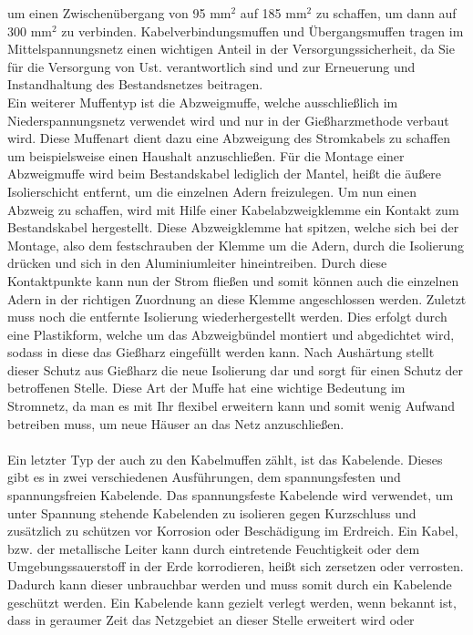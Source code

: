 um einen Zwischenübergang von 95 mm$^2$ auf 185 mm$^2$ zu schaffen, um dann auf 300 mm$^2$ zu verbinden. Kabelverbindungsmuffen und Übergangsmuffen tragen im 
Mittelspannungsnetz einen wichtigen Anteil in der Versorgungssicherheit, da Sie für die Versorgung von Ust. verantwortlich sind und zur Erneuerung und 
Instandhaltung des Bestandsnetzes beitragen. \autocite{Cellpack}
\\
Ein weiterer Muffentyp ist die Abzweigmuffe, welche ausschließlich im Niederspannungsnetz verwendet wird und nur in der Gießharzmethode verbaut wird. Diese 
Muffenart dient dazu eine Abzweigung des Stromkabels zu schaffen um beispielsweise einen Haushalt anzuschließen. Für die Montage einer Abzweigmuffe wird beim 
Bestandskabel lediglich der Mantel, heißt die äußere Isolierschicht entfernt, um die einzelnen Adern freizulegen. Um nun einen Abzweig zu schaffen, wird mit 
Hilfe einer Kabelabzweigklemme ein Kontakt zum Bestandskabel hergestellt. Diese Abzweigklemme hat spitzen, welche sich bei der Montage, also dem festschrauben 
der Klemme um die Adern, durch die Isolierung drücken und sich in den Aluminiumleiter hineintreiben. Durch diese Kontaktpunkte kann nun der Strom fließen und 
somit können auch die einzelnen Adern in der richtigen Zuordnung an diese Klemme angeschlossen werden. Zuletzt muss noch die entfernte Isolierung 
wiederhergestellt werden. Dies erfolgt durch eine Plastikform, welche um das Abzweigbündel montiert und abgedichtet wird, sodass in diese das Gießharz 
eingefüllt werden kann. Nach Aushärtung stellt dieser Schutz aus Gießharz die neue Isolierung dar und sorgt für einen Schutz der betroffenen Stelle. Diese 
Art der Muffe hat eine wichtige Bedeutung im Stromnetz, da man es mit Ihr flexibel erweitern kann und somit wenig Aufwand betreiben muss, um \zB neue Häuser 
an das Netz anzuschließen. \autocite{Cellpack}
\\\\
Ein letzter Typ der auch zu den Kabelmuffen zählt, ist das Kabelende. Dieses gibt es in zwei verschiedenen Ausführungen, dem spannungsfesten und 
spannungsfreien Kabelende. Das spannungsfeste Kabelende wird verwendet, um unter Spannung stehende Kabelenden zu isolieren gegen Kurzschluss und zusätzlich 
zu schützen vor Korrosion oder Beschädigung im Erdreich. Ein Kabel, bzw. der metallische Leiter kann durch eintretende Feuchtigkeit oder dem 
Umgebungssauerstoff in der Erde korrodieren, heißt sich zersetzen oder verrosten. Dadurch kann dieser unbrauchbar werden und muss somit durch ein Kabelende 
geschützt werden. Ein Kabelende kann gezielt verlegt werden, wenn \zB bekannt ist, dass in geraumer Zeit das Netzgebiet an dieser Stelle erweitert wird oder 
